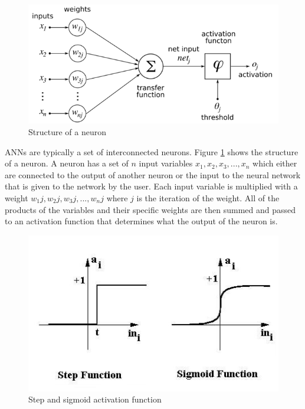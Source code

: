 \begin{figure}[ht]
	\centering
  \includegraphics[scale=0.65]{figures/neuron_structure.png}
	\caption[Structure of a neuron]{Structure of a neuron \protect\footnotemark}
	\label{neuron}
\end{figure}

ANNs are typically a set of interconnected neurons. Figure \ref{neuron} shows the structure of a neuron. A neuron has a set of $n$ input variables $x_1, x_2, x_3, ..., x_n$ which either are connected to the output of another neuron or the input to the neural network that is given to the network by the user. Each input variable is multiplied with a weight $w_1j, w_2j, w_3j, ..., w_nj$ where $j$ is the iteration of the weight. All of the products of the variables and their specific weights are then summed and passed to an activation function that determines what the output of the neuron is.

\begin{figure}[ht]
	\centering
  \includegraphics[scale=0.6]{figures/activation_functions.jpg}
	\caption[Step and sigmoid activation function]{Step and sigmoid activation function \protect\footnotemark}
	\label{activation_functions}
\end{figure}


